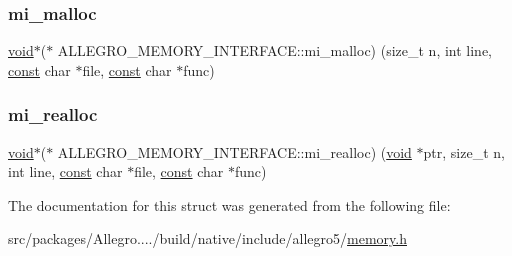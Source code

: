 \mbox{\label{struct_a_l_l_e_g_r_o___m_e_m_o_r_y___i_n_t_e_r_f_a_c_e_af9c5b17421e98f7415486bac52cbd487}} 
\subsubsection{\texorpdfstring{mi\+\_\+malloc}{mi\_malloc}}
{\footnotesize\ttfamily \hyperlink{png_8h_ac9c84fa68bbad002983e35ce3663c686}{void}$\ast$($\ast$ A\+L\+L\+E\+G\+R\+O\+\_\+\+M\+E\+M\+O\+R\+Y\+\_\+\+I\+N\+T\+E\+R\+F\+A\+C\+E\+::mi\+\_\+malloc) (size\+\_\+t n, int line, \hyperlink{zconf_8h_a2c212835823e3c54a8ab6d95c652660e}{const} char $\ast$file, \hyperlink{zconf_8h_a2c212835823e3c54a8ab6d95c652660e}{const} char $\ast$func)}

\mbox{\label{struct_a_l_l_e_g_r_o___m_e_m_o_r_y___i_n_t_e_r_f_a_c_e_a0ff03db35efec30eec7d1dd55bb9c831}} 
\subsubsection{\texorpdfstring{mi\+\_\+realloc}{mi\_realloc}}
{\footnotesize\ttfamily \hyperlink{png_8h_ac9c84fa68bbad002983e35ce3663c686}{void}$\ast$($\ast$ A\+L\+L\+E\+G\+R\+O\+\_\+\+M\+E\+M\+O\+R\+Y\+\_\+\+I\+N\+T\+E\+R\+F\+A\+C\+E\+::mi\+\_\+realloc) (\hyperlink{png_8h_ac9c84fa68bbad002983e35ce3663c686}{void} $\ast$ptr, size\+\_\+t n, int line, \hyperlink{zconf_8h_a2c212835823e3c54a8ab6d95c652660e}{const} char $\ast$file, \hyperlink{zconf_8h_a2c212835823e3c54a8ab6d95c652660e}{const} char $\ast$func)}



The documentation for this struct was generated from the following file\+:\begin{DoxyCompactItemize}
\item 
src/packages/\+Allegro..../build/native/include/allegro5/\hyperlink{memory_8h}{memory.\+h}\end{DoxyCompactItemize}
